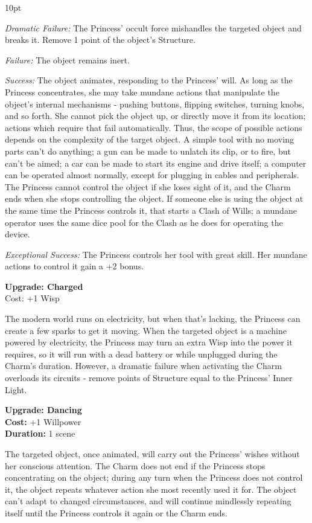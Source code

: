 \begin{myindentpar}{10pt}

\emph{Dramatic  Failure:}  The  Princess’  occult  force  mishandles  the  targeted  object  and
breaks it. Remove 1 point of the object’s Structure.

\emph{Failure:} The object remains inert.

\emph{Success:} The object animates, responding to the Princess’ will. As long as the Princess concentrates, she may take mundane actions that manipulate the object’s internal mechanisms - pushing buttons, flipping switches, turning knobs, and so forth. She cannot pick the object up, or directly move it from its location; actions which require that fail automatically. Thus, the scope of possible actions depends on the complexity of the target object. A simple tool with no moving parts can’t do anything; a gun can be made to unlatch its clip, or to fire, but can’t be aimed; a car can be made to start its engine and drive itself; a computer can be operated almost normally, except for plugging in cables and peripherals. The Princess cannot control the object if she loses sight of it, and the Charm ends when she stops controlling the object. If someone else is using the object at the same time the Princess controls it, that starts a Clash of Wills; a mundane operator uses the same dice pool for the Clash as he 
does for operating the device.

\emph{Exceptional Success:} The Princess controls her tool with great skill. Her mundane actions to control it gain a +2 bonus.

\textbf{Upgrade: Charged}\\
Cost: +1 Wisp

The modern world runs on electricity, but when that’s lacking, the Princess can create a few sparks to get it moving. When the targeted object is a machine powered by electricity, the Princess may turn an extra Wisp into the power it requires, so it will run with a dead battery or while unplugged during the Charm’s duration. However, a dramatic failure when activating the Charm overloads its circuits - remove points of Structure equal to the Princess’ Inner Light.

\textbf{Upgrade: Dancing}\\

\noindent \textbf{Cost:} +1 Willpower\\

\noindent \textbf{Duration:} 1 scene

The targeted object, once animated, will carry out the Princess’ wishes without her conscious attention. The Charm does not end if the Princess stops concentrating on the object; during any turn when the Princess does not control it, the object repeats whatever action she most recently used it for. The object can’t adapt to changed circumstances, and will continue mindlessly repeating itself until the Princess controls it again or the Charm ends.


\end{myindentpar}
